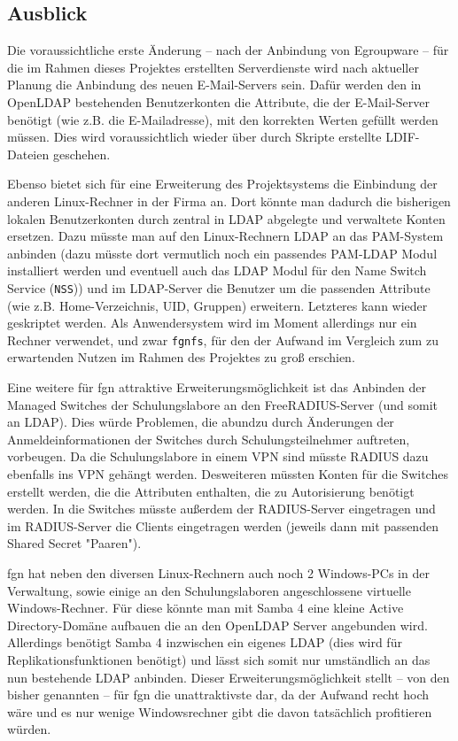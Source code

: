 \documentclass[11pt,a4paper,titlepage=firstiscover,headsepline,bibtotoc]{scrartcl} %
\begin{document}
\subsection{Ausblick}
Die voraussichtliche erste Änderung -- nach der Anbindung von Egroupware -- für die im Rahmen dieses Projektes erstellten Serverdienste wird nach aktueller Planung die Anbindung des neuen E-Mail-Servers sein. Dafür werden den in OpenLDAP bestehenden Benutzerkonten die Attribute, die der E-Mail-Server benötigt (wie z.B. die E-Mailadresse), mit den korrekten Werten gefüllt werden müssen. Dies wird voraussichtlich wieder über durch Skripte erstellte LDIF-Dateien geschehen.

Ebenso bietet sich für eine Erweiterung des Projektsystems die Einbindung der anderen Linux-Rechner in der Firma an. Dort könnte man dadurch die bisherigen lokalen Benutzerkonten durch zentral in LDAP abgelegte und verwaltete Konten ersetzen. Dazu müsste man auf den Linux-Rechnern LDAP an das PAM-System anbinden (dazu müsste dort vermutlich noch ein passendes PAM-LDAP Modul installiert werden und eventuell auch das LDAP Modul für den Name Switch Service (\texttt{NSS})) und im LDAP-Server die Benutzer um die passenden Attribute (wie z.B. Home-Verzeichnis, UID, Gruppen) erweitern. Letzteres kann wieder geskriptet werden. Als Anwendersystem wird im Moment allerdings nur ein Rechner verwendet, und zwar \texttt{fgnfs}, für den der Aufwand im Vergleich zum zu erwartenden Nutzen im Rahmen des Projektes zu groß erschien.

Eine weitere für fgn attraktive Erweiterungsmöglichkeit ist das Anbinden der Managed Switches der Schulungslabore an den FreeRADIUS-Server (und somit an LDAP). Dies würde Problemen, die abundzu durch Änderungen der Anmeldeinformationen der Switches durch Schulungsteilnehmer auftreten, vorbeugen. Da die Schulungslabore in einem VPN sind müsste RADIUS dazu ebenfalls ins VPN gehängt werden. Desweiteren müssten Konten für die Switches erstellt werden, die die Attributen enthalten, die zu Autorisierung benötigt werden. In die Switches müsste außerdem der RADIUS-Server eingetragen und im RADIUS-Server die Clients eingetragen werden (jeweils dann mit passenden Shared Secret "Paaren").

fgn hat neben den diversen Linux-Rechnern auch noch 2 Windows-PCs in der Verwaltung, sowie einige an den Schulungslaboren angeschlossene virtuelle Windows-Rechner. Für diese könnte man mit Samba 4 eine kleine Active Directory-Domäne aufbauen die an den OpenLDAP Server angebunden wird. Allerdings benötigt Samba 4 inzwischen ein eigenes LDAP (dies wird für Replikationsfunktionen benötigt) und lässt sich somit nur umständlich an das nun bestehende LDAP anbinden. Dieser Erweiterungsmöglichkeit stellt -- von den bisher genannten -- für fgn die unattraktivste dar, da der Aufwand recht hoch wäre und es nur wenige Windowsrechner gibt die davon tatsächlich profitieren würden.
\end{document}
